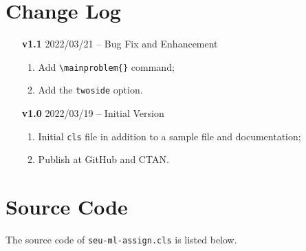 \documentclass[twoside]{seu-ml-assign}
\begin{document}
  \section{Change Log}

    \begin{itemize}
      \item [\textbf{v1.1}] 2022/03/21 -- Bug Fix and Enhancement
        \begin{enumerate}
          \item Add \verb|\mainproblem{}| command;
          \item Add the \texttt{twoside} option.
        \end{enumerate}
      \item [\textbf{v1.0}] 2022/03/19 -- Initial Version
        \begin{enumerate}
          \item Initial \texttt{cls} file in addition to a sample file and documentation;
          \item Publish at GitHub and CTAN.
        \end{enumerate}
    \end{itemize}

  \section{Source Code}

    The source code of \texttt{seu-ml-assign.cls} is listed below.

    
\end{document}

